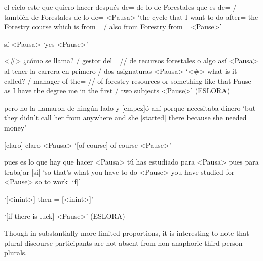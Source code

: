 \documentclass[output=paper]{langscibook}
\begin{document}
\ea\label{ex:pierre:4}
\begin{xlist}[Speaker 2]
 el ciclo este que quiero hacer después de= de lo de Forestales que es de= / también de Forestales de lo de= <Pausa>
 ‘the cycle that I want to do after= the Forestry course which is from= / also from Forestry from= <Pause>’

 sí  <Pausa>
 ‘yes <Pause>’

 <\#> ¿cómo se llama? / gestor del= // de recursos forestales o algo así <Pausa> al  tener  la carrera {}{ {en primero / dos asignaturas <Pausa>}} 
 {‘<\#> what is it called? / manager of the= // of forestry resources or something like that Pause as I have the degree} { } {me in the first / two subjects  <Pause>’ (ESLORA)}
\end{xlist}
\ex\label{ex:pierre:5}
\begin{xlist}[Speaker 2]
 pero no la llamaron de ningún lado y [empez]ó ahí porque necesitaba dinero
 {‘but they didn't call her from anywhere and she [started] there because she needed money’}

 {[claro] claro <Pausa>}
 ‘[of course] of course <Pause>’

 pues es lo que hay que hacer <Pausa>  tú has estudiado para <Pausa>  pues para trabajar [si]
 ‘so that's what you have to do <Pause> you have studied for <Pause> so to work [if]’

 ‘[<inint>] then {   }{= [<inint>]’} 

 ‘[if there is luck] <Pause>’ (ESLORA)
\end{xlist}
\z

Though in substantially more limited proportions, it is interesting to note that plural discourse participants are not absent from non-anaphoric third person plurals.\largerpage[2]
\end{document}
